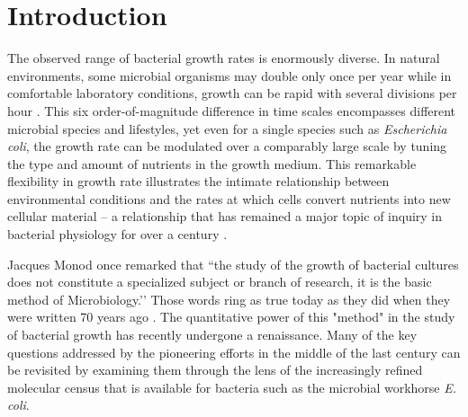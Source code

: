 \section{Introduction}
The observed range of bacterial growth rates is enormously diverse. In
natural environments, some microbial organisms may double only once per
year \citep{mikucki2009} while in comfortable laboratory conditions, growth
can be rapid with several divisions per hour \citep{schaechter1958}. This six
order-of-magnitude difference in time scales encompasses different microbial
species and lifestyles, yet even for a single species such as \textit{Escherichia
coli}, the growth rate can be modulated over a comparably large scale by tuning the
type and amount of nutrients in the growth medium. This remarkable
flexibility in growth rate illustrates the intimate relationship between
environmental conditions and the rates at which cells convert nutrients into
new cellular material -- a relationship that has remained a major topic of
inquiry in bacterial physiology for over a century \citep{jun2018}.

Jacques Monod once remarked that ``the study of the growth of bacterial
cultures does not constitute a specialized subject or branch of research, it
is the basic method of Microbiology.’’ Those words ring as true today as they
did when they were written 70 years ago \citep{monod1949}. The quantitative
power of this "method" in the study of bacterial growth has recently
undergone a renaissance. Many of the key questions addressed by the
pioneering efforts in the middle of the last century can be revisited by
examining them through the lens of the increasingly refined molecular census
that is available for bacteria such as the microbial workhorse \textit{E.
coli}.

